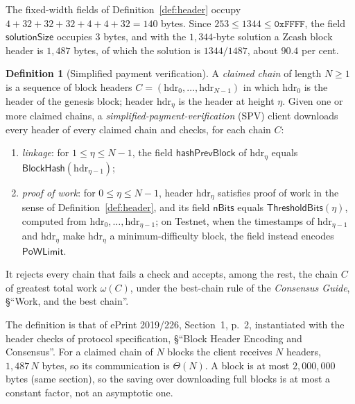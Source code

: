 \documentclass[11pt,a4paper]{article}
\theoremstyle{definition}
\newtheorem{definition}[theorem]{Definition}
\begin{document}
The fixed-width fields of Definition~\ref{def:header} occupy
$4 + 32 + 32 + 32 + 4 + 4 + 32 = 140$ bytes. Since
$253 \le 1344 \le \mathtt{0xFFFF}$, the field $\mathsf{solutionSize}$
occupies $3$ bytes, and with the $1{,}344$-byte solution a Zcash block
header is $1{,}487$ bytes, of which the solution is $1344/1487$, about
$90.4$ per cent.

\begin{definition}[Simplified payment verification]\label{def:spv}
A \emph{claimed chain} of length $N \ge 1$ is a sequence of block headers
$C = (\mathrm{hdr}_0, \dots, \mathrm{hdr}_{N-1})$ in which $\mathrm{hdr}_0$
is the header of the genesis block; header $\mathrm{hdr}_\eta$ is the header at
height $\eta$. Given one or more claimed chains, a
\emph{simplified-payment-verification} (SPV) client downloads every header of
every claimed chain and checks, for each chain $C$:
\begin{enumerate}[label=(S\arabic*)]
\item \emph{linkage}: for $1 \le \eta \le N - 1$, the field
  $\mathsf{hashPrevBlock}$ of $\mathrm{hdr}_\eta$ equals
  $\mathsf{BlockHash}(\mathrm{hdr}_{\eta-1})$;
\item \emph{proof of work}: for $0 \le \eta \le N - 1$, header
  $\mathrm{hdr}_\eta$ satisfies proof of work in the sense of
  Definition~\ref{def:header}, and its field $\mathsf{nBits}$ equals
  $\mathsf{ThresholdBits}(\eta)$, computed from $\mathrm{hdr}_0, \dots,
  \mathrm{hdr}_{\eta-1}$; on Testnet, when the timestamps of
  $\mathrm{hdr}_{\eta-1}$ and $\mathrm{hdr}_\eta$ make $\mathrm{hdr}_\eta$ a
  minimum-difficulty block, the field instead encodes $\mathsf{PoWLimit}$.
\end{enumerate}
It rejects every chain that fails a check and accepts, among the rest, the
chain $C$ of greatest total work $\omega(C)$, under the best-chain rule of
the \emph{Consensus Guide}, \S``Work, and the best chain''.
\end{definition}

The definition is that of ePrint 2019/226, Section~1, p.~2, instantiated
with the header checks of protocol specification, \S``Block Header Encoding
and Consensus''. For a claimed chain of $N$ blocks the client receives $N$
headers, $1{,}487\,N$ bytes, so its communication is $\Theta(N)$. A block is
at most $2{,}000{,}000$ bytes (same section), so the saving over
downloading full blocks is at most a constant factor, not an asymptotic
one.
\end{document}
